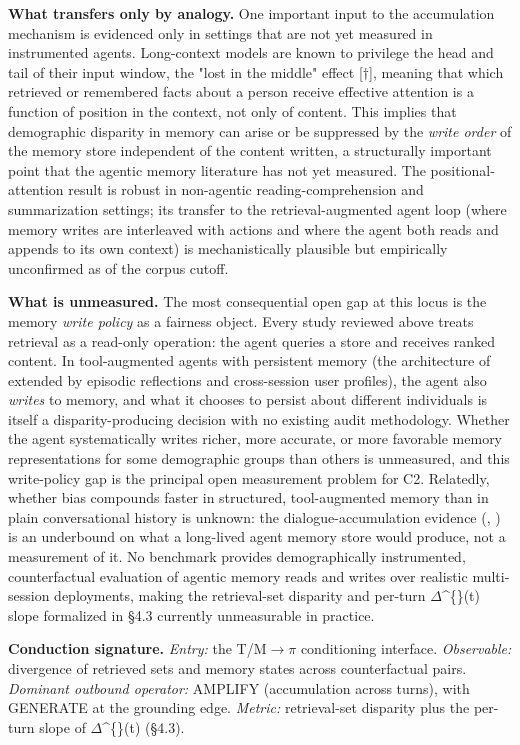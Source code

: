 \documentclass[10pt]{article}
\begin{document}
\textbf{What transfers only by analogy.} One important input to the accumulation mechanism is evidenced only in settings that are not yet measured in instrumented agents. Long-context models are known to privilege the head and tail of their input window, the "lost in the middle" effect \cite{liu2023lost}[$\dagger$], meaning that which retrieved or remembered facts about a person receive effective attention is a function of position in the context, not only of content. This implies that demographic disparity in memory can arise or be suppressed by the \emph{write order} of the memory store independent of the content written, a structurally important point that the agentic memory literature has not yet measured. The positional-attention result is robust in non-agentic reading-comprehension and summarization settings; its transfer to the retrieval-augmented agent loop (where memory writes are interleaved with actions and where the agent both reads and appends to its own context) is mechanistically plausible but empirically unconfirmed as of the corpus cutoff.

\textbf{What is unmeasured.} The most consequential open gap at this locus is the memory \emph{write policy} as a fairness object. Every study reviewed above treats retrieval as a read-only operation: the agent queries a store and receives ranked content. In tool-augmented agents with persistent memory (the architecture of \cite{lewis2020retrieval} extended by episodic reflections and cross-session user profiles), the agent also \emph{writes} to memory, and what it chooses to persist about different individuals is itself a disparity-producing decision with no existing audit methodology. Whether the agent systematically writes richer, more accurate, or more favorable memory representations for some demographic groups than others is unmeasured, and this write-policy gap is the principal open measurement problem for C2. Relatedly, whether bias compounds faster in structured, tool-augmented memory than in plain conversational history is unknown: the dialogue-accumulation evidence (\cite{fan2024fairmt}, \cite{simhi2026old}) is an underbound on what a long-lived agent memory store would produce, not a measurement of it. No benchmark provides demographically instrumented, counterfactual evaluation of agentic memory reads and writes over realistic multi-session deployments, making the retrieval-set disparity and per-turn $\Delta$\textasciicircum\{\}(t) slope formalized in \S{}4.3 currently unmeasurable in practice.

\textbf{Conduction signature.} \emph{Entry:} the T/M$\rightarrow$$\pi$ conditioning interface. \emph{Observable:} divergence of retrieved sets and memory states across counterfactual pairs. \emph{Dominant outbound operator:} AMPLIFY (accumulation across turns), with GENERATE at the grounding edge. \emph{Metric:} retrieval-set disparity plus the per-turn slope of $\Delta$\textasciicircum\{\}(t) (\S{}4.3).
\end{document}
